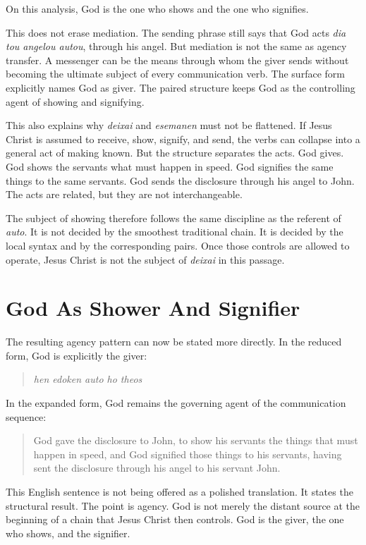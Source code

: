 On this analysis, God is the one who shows and the one who signifies.

This does not erase mediation. The sending phrase still says that God acts \textit{dia tou angelou autou}, through his angel. But mediation is not the same as agency transfer. A messenger can be the means through whom the giver sends without becoming the ultimate subject of every communication verb. The surface form explicitly names God as giver. The paired structure keeps God as the controlling agent of showing and signifying.

This also explains why \textit{deixai} and \textit{esemanen} must not be flattened. If Jesus Christ is assumed to receive, show, signify, and send, the verbs can collapse into a general act of making known. But the structure separates the acts. God gives. God shows the servants what must happen in speed. God signifies the same things to the same servants. God sends the disclosure through his angel to John. The acts are related, but they are not interchangeable.

The subject of showing therefore follows the same discipline as the referent of \textit{auto}. It is not decided by the smoothest traditional chain. It is decided by the local syntax and by the corresponding pairs. Once those controls are allowed to operate, Jesus Christ is not the subject of \textit{deixai} in this passage.

\section{God As Shower And Signifier}

The resulting agency pattern can now be stated more directly. In the reduced form, God is explicitly the giver:

\begin{quote}
\textit{hen edoken auto ho theos}
\end{quote}

In the expanded form, God remains the governing agent of the communication sequence:

\begin{quote}
God gave the disclosure to John, to show his servants the things that must happen in speed, and God signified those things to his servants, having sent the disclosure through his angel to his servant John.
\end{quote}

This English sentence is not being offered as a polished translation. It states the structural result. The point is agency. God is not merely the distant source at the beginning of a chain that Jesus Christ then controls. God is the giver, the one who shows, and the signifier.

